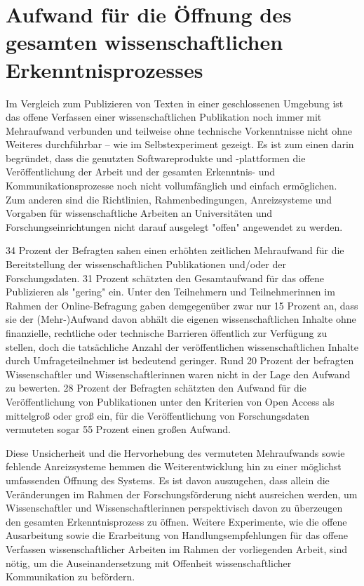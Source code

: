 \section{Aufwand für die Öffnung des gesamten wissenschaftlichen Erkenntnisprozesses}

Im Vergleich zum Publizieren von Texten in einer geschlossenen Umgebung ist das offene Verfassen einer wissenschaftlichen Publikation noch immer mit Mehraufwand verbunden und teilweise ohne technische Vorkenntnisse nicht ohne Weiteres durchführbar – wie im Selbstexperiment gezeigt. Es ist zum einen darin begründet, dass die genutzten Softwareprodukte und -plattformen die Veröffentlichung der Arbeit und der gesamten Erkenntnis- und Kommunikationsprozesse noch nicht vollumfänglich und einfach ermöglichen. Zum anderen sind die Richtlinien, Rahmenbedingungen, Anreizsysteme und Vorgaben für wissenschaftliche Arbeiten an Universitäten und Forschungseinrichtungen nicht darauf ausgelegt "offen" angewendet zu werden.

34 Prozent der Befragten sahen einen erhöhten zeitlichen Mehraufwand für die Bereitstellung der wissenschaftlichen Publikationen und/oder der Forschungsdaten. 31 Prozent schätzten den Gesamtaufwand für das offene Publizieren als "gering" ein. Unter den Teilnehmern und Teilnehmerinnen im Rahmen der Online-Befragung gaben demgegenüber zwar nur 15 Prozent an, dass sie der (Mehr-)Aufwand davon abhält die eigenen wissenschaftlichen Inhalte ohne finanzielle, rechtliche oder technische Barrieren öffentlich zur Verfügung zu stellen, doch die tatsächliche Anzahl der veröffentlichen wissenschaftlichen Inhalte durch Umfrageteilnehmer ist bedeutend geringer. Rund 20 Prozent der befragten Wissenschaftler und Wissenschaftlerinnen waren nicht in der Lage den Aufwand zu bewerten. 28 Prozent der Befragten schätzten den Aufwand für die Veröffentlichung von Publikationen unter den Kriterien von Open Access als mittelgroß oder groß ein, für die Veröffentlichung von Forschungsdaten vermuteten sogar 55 Prozent einen großen Aufwand.

Diese Unsicherheit und die Hervorhebung des vermuteten Mehraufwands sowie fehlende Anreizsysteme hemmen die Weiterentwicklung hin zu einer möglichst umfassenden Öffnung des Systems. Es ist davon auszugehen, dass allein die Veränderungen im Rahmen der Forschungsförderung nicht ausreichen werden, um Wissenschaftler und Wissenschaftlerinnen perspektivisch davon zu überzeugen den gesamten Erkenntnisprozess zu öffnen. Weitere Experimente, wie die offene Ausarbeitung sowie die Erarbeitung von Handlungsempfehlungen für das offene Verfassen wissenschaftlicher Arbeiten im Rahmen der vorliegenden Arbeit, sind nötig, um die Auseinandersetzung mit Offenheit wissenschaftlicher Kommunikation zu befördern.

